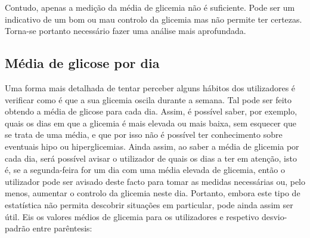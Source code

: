  Contudo, apenas a medição da média de glicemia não é suficiente. Pode ser um indicativo de um bom ou mau controlo da glicemia mas não permite ter certezas. Torna-se portanto necessário fazer uma análise mais aprofundada.



\subsection{Média de glicose por dia}

Uma forma mais detalhada de tentar perceber alguns hábitos dos utilizadores é verificar como é que a sua glicemia oscila durante a semana. Tal pode ser feito obtendo a média de glicose para cada dia. Assim, é possível saber, por exemplo, quais os dias em que a glicemia é mais elevada ou mais baixa, sem esquecer que se trata de uma média, e que por isso não é possível ter conhecimento sobre eventuais hipo ou hiperglicemias. Ainda assim, ao saber a média de glicemia por cada dia, será possível avisar o utilizador de quais os dias a ter em atenção, isto é, se a segunda-feira for um dia com uma média elevada de glicemia, então o utilizador pode ser avisado deste facto para tomar as medidas necessárias ou, pelo menos, aumentar o controlo da glicemia neste dia. Portanto, embora este tipo de estatística não permita descobrir situações em particular, pode ainda assim ser útil. Eis os valores médios de glicemia para os utilizadores e respetivo desvio-padrão entre parêntesis:\newline




